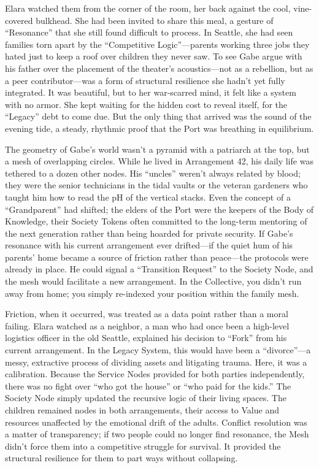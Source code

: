 Elara watched them from the corner of the room, her back against the cool, vine-covered bulkhead. She had been invited to share this meal, a gesture of ``Resonance'' that she still found difficult to process. In Seattle, she had seen families torn apart by the ``Competitive Logic''—parents working three jobs they hated just to keep a roof over children they never saw. To see Gabe argue with his father over the placement of the theater's acoustics—not as a rebellion, but as a peer contributor—was a form of structural resilience she hadn't yet fully integrated. It was beautiful, but to her war-scarred mind, it felt like a system with no armor. She kept waiting for the hidden cost to reveal itself, for the ``Legacy'' debt to come due. But the only thing that arrived was the sound of the evening tide, a steady, rhythmic proof that the Port was breathing in equilibrium.

The geometry of Gabe's world wasn't a pyramid with a patriarch at the top, but a mesh of overlapping circles. While he lived in Arrangement 42, his daily life was tethered to a dozen other nodes. His ``uncles'' weren't always related by blood; they were the senior technicians in the tidal vaults or the veteran gardeners who taught him how to read the pH of the vertical stacks. Even the concept of a ``Grandparent'' had shifted; the elders of the Port were the keepers of the Body of Knowledge, their Society Tokens often committed to the long-term mentoring of the next generation rather than being hoarded for private security. If Gabe's resonance with his current arrangement ever drifted—if the quiet hum of his parents' home became a source of friction rather than peace—the protocols were already in place. He could signal a ``Transition Request'' to the Society Node, and the mesh would facilitate a new arrangement. In the Collective, you didn't run away from home; you simply re-indexed your position within the family mesh.

Friction, when it occurred, was treated as a data point rather than a moral failing. Elara watched as a neighbor, a man who had once been a high-level logistics officer in the old Seattle, explained his decision to ``Fork'' from his current arrangement. In the Legacy System, this would have been a ``divorce''—a messy, extractive process of dividing assets and litigating trauma. Here, it was a calibration. Because the Service Nodes provided for both parties independently, there was no fight over ``who got the house'' or ``who paid for the kids.'' The Society Node simply updated the recursive logic of their living spaces. The children remained nodes in both arrangements, their access to Value and resources unaffected by the emotional drift of the adults. Conflict resolution was a matter of transparency; if two people could no longer find resonance, the Mesh didn't force them into a competitive struggle for survival. It provided the structural resilience for them to part ways without collapsing.

